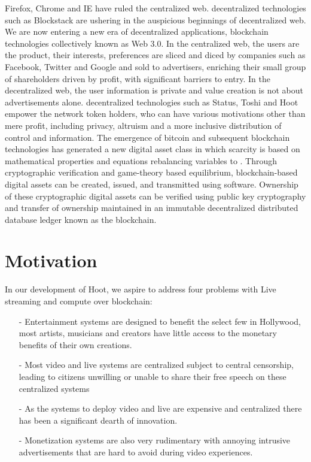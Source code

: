 \documentclass{article}
\begin{document}

  
 Firefox, Chrome and IE have ruled the centralized web. decentralized technologies
such as Blockstack are ushering in the auspicious beginnings of
decentralized web. 
 We are now entering a new era of decentralized applications, blockchain technologies collectively known as Web 3.0. In the centralized web, the users are the product,
their interests, preferences are sliced and diced by companies such as
Facebook, Twitter and Google and sold to advertisers, enriching their
small group of shareholders driven by profit, with significant barriers to entry. In the
decentralized web, the user information is private and value creation is not about advertisements alone. decentralized
technologies such as Status, Toshi and Hoot empower the network token
holders, who can have various motivations other than mere profit,
including privacy, altruism and a more inclusive distribution of
control and information. The emergence of bitcoin and subsequent blockchain technologies has generated a new digital asset class in which scarcity is based on mathematical properties and equations rebalancing variables to . Through cryptographic verification and game-theory based equilibrium, blockchain-based digital assets can be created, issued, and transmitted using software. Ownership of these cryptographic digital assets can be verified using public key cryptography and transfer of ownership maintained in an immutable decentralized distributed database ledger known as the blockchain.


\section{Motivation}
In our development of Hoot, we aspire to address four problems with
Live streaming and compute over blockchain:
\begin{itemize}
\item[-] Entertainment systems are designed to benefit the select few
  in Hollywood, most artists, musicians and creators have little access to the monetary
  benefits of their own creations.
\item[-] Most video and live systems are centralized subject to
  central censorship, leading to citizens unwilling or unable to
  share their free speech on these centralized systems
\item[-] As the systems to deploy video and live are expensive and
  centralized there has been a significant dearth of innovation.
\item[-] Monetization systems are also very rudimentary with annoying
  intrusive advertisements that are hard to avoid during video
  experiences. 
\end{itemize}
\end{document}

